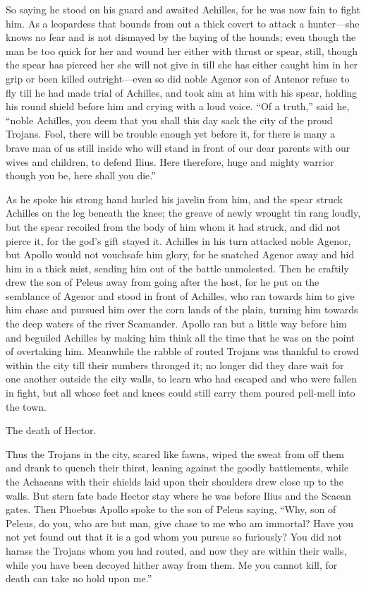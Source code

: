 So saying he stood on his guard and awaited Achilles, for he was now fain
to fight him. As a leopardess that bounds from out a thick covert to
attack a hunter—she knows no fear and is not dismayed by the baying
of the hounds; even though the man be too quick for her and wound her
either with thrust or spear, still, though the spear has pierced her she
will not give in till she has either caught him in her grip or been killed
outright—even so did noble Agenor son of Antenor refuse to fly till
he had made trial of Achilles, and took aim at him with his spear, holding
his round shield before him and crying with a loud voice. “Of a truth,”
said he, “noble Achilles, you deem that you shall this day sack the city
of the proud Trojans. Fool, there will be trouble enough yet before it,
for there is many a brave man of us still inside who will stand in front
of our dear parents with our wives and children, to defend Ilius. Here
therefore, huge and mighty warrior though you be, here shall you die.”

As he spoke his strong hand hurled his javelin from him, and the spear
struck Achilles on the leg beneath the knee; the greave of newly wrought
tin rang loudly, but the spear recoiled from the body of him whom it had
struck, and did not pierce it, for the god’s gift stayed it. Achilles in
his turn attacked noble Agenor, but Apollo would not vouchsafe him glory,
for he snatched Agenor away and hid him in a thick mist, sending him out
of the battle unmolested. Then he craftily drew the son of Peleus away
from going after the host, for he put on the semblance of Agenor and stood
in front of Achilles, who ran towards him to give him chase and pursued
him over the corn lands of the plain, turning him towards the deep waters
of the river Scamander. Apollo ran but a little way before him and
beguiled Achilles by making him think all the time that he was on the
point of overtaking him. Meanwhile the rabble of routed Trojans was
thankful to crowd within the city till their numbers thronged it; no
longer did they dare wait for one another outside the city walls, to learn
who had escaped and who were fallen in fight, but all whose feet and knees
could still carry them poured pell-mell into the town.


The death of Hector.

Thus the Trojans in the city, scared like fawns, wiped the sweat from off
them and drank to quench their thirst, leaning against the goodly
battlements, while the Achaeans with their shields laid upon their
shoulders drew close up to the walls. But stern fate bade Hector stay
where he was before Ilius and the Scaean gates. Then Phoebus Apollo spoke
to the son of Peleus saying, “Why, son of Peleus, do you, who are but man,
give chase to me who am immortal? Have you not yet found out that it is a
god whom you pursue so furiously? You did not harass the Trojans whom you
had routed, and now they are within their walls, while you have been
decoyed hither away from them. Me you cannot kill, for death can take no
hold upon me.”

